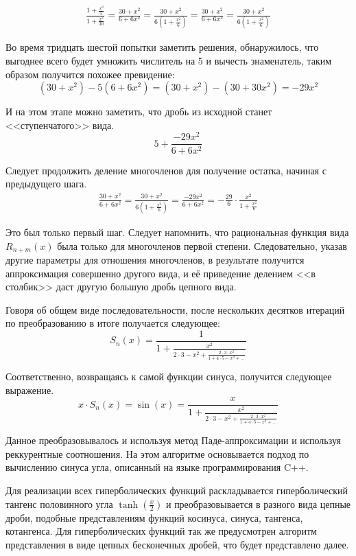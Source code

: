 \documentclass{article}
\begin{document}
    \begin{eqnarray*}
        \frac{1 + \frac{x^2}{5}}{1 + \frac{x^2}{30}} = 
        \frac{30 + x^2}{6 + 6x^2} = \frac{30 + x^2}{6(1 + \frac{x^2}{6})} = 
        \frac{30 + x^2}{6 + 6x^2} = \frac{30 + x^2}{6(1 + \frac{x^2}{6})}
    \end{eqnarray*}
    
    Во время тридцать шестой попытки заметить решения, обнаружилось, что
    выгоднее всего будет умножить числитель на 5 и вычесть знаменатель, 
    таким образом получится похожее превидение:
    $$(30 + x^2) - 5(6 + 6x^2) = (30 + x^2) - (30 + 30x^2) = -29x^2$$

    И на этом этапе можно заметить, что дробь из исходной станет <<ступенчатого>> вида.
    $$5 + \frac{-29x^2}{6 + 6x^2}$$
    
    Следует продолжить деление многочленов для получение остатка, начиная с предыдущего шага.
    \begin{eqnarray*}
        \frac{30 + x^2}{6 + 6x^2} = \frac{30 + x^2}{6(1 + \frac{x^2}{6})} =
        \frac{-29x^2}{6 + 6x^2} = -\frac{29}{6} \cdot \frac{x^2}{1 + \frac{x^2}{6}}
    \end{eqnarray*}
    
    Это был только первый шаг. Следует напомнить, что рациональная функция вида $R_{n+m}(x)$ была
    только для многочленов первой степени. Следовательно, указав другие параметры
    для отношения многочленов, в результате получится аппроксимация совершенно другого вида,
    и её приведение делением <<в столбик>> даст другую большую дробь цепного вида.
    
    Говоря об общем виде последовательности, после нескольких десятков 
    итераций по преобразованию в итоге получается следующее:
    $$S_n(x) = \frac{1}{1 + \frac{x^2}{2 \cdot 3 - x^2 + \frac{2 \cdot 3 \cdot x^2}{1 + 4 \cdot 5 - x^2 + \dots}}}$$
    
    Соответственно, возвращаясь к самой функции синуса, получится следующее выражение.
    $$x \cdot S_n(x) = \sin(x) = \frac{x}{1 + \frac{x^2}{2 \cdot 3 - x^2 + \frac{2 \cdot 3 \cdot x^2}{1 + 4 \cdot 5 - x^2 + \dots}}}$$

    Данное преобразовывалось и используя метод Паде-аппроксимации и используя реккурентные соотношения.
    На этом алгоритме основывается подход по вычислению синуса угла, описанный на языке программирования C++.
    
    Для реализации всех гиперболических функций раскладывается 
    гиперболический тангенс 
    половинного угла $\tanh(\frac{x}{2})$
    и преобразовывается в разного вида цепные дроби, 
    подобные представлениям функций
    косинуса, синуса, тангенса, котангенса.
    Для гиперболических функций так же предусмотрен 
    алгоритм представления
    в виде цепных бесконечных дробей, 
    что будет представлено далее.
\end{document}
